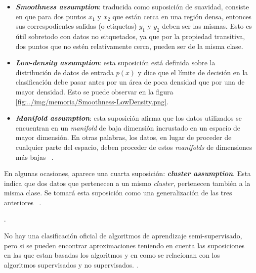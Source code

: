 \begin{itemize}
	\item \textit{\textbf{Smoothness assumption}}: traducida como suposición de suavidad, consiste en que para dos puntos $x_{1}$ y $x_{2}$ que están cerca en una región densa, entonces sus correspodientes salidas (o etiquetas) $y_{1}$ y $y_{2}$ deben ser las mismas. Esto es útil sobretodo con datos no eitquetados, ya que por la propiedad transitiva, dos puntos que no estén relativamente cerca, pueden ser de la misma clase.
	\item \textit{\textbf{Low-density assumption}}: esta suposición está definida sobre la distribución de datos de entrada $p(x)$ y dice que el límite de decisión en la clasificación debe pasar antes por un área de poca densidad que por una de mayor densidad. Esto se puede observar en la figura \ref{fig:../img/memoria/Smoothness-LowDensity.png}.

	
	\item \textit{\textbf{Manifold assumption}}: esta suposición afirma que los datos utilizados se encuentran en un \textit{manifold} de baja dimensión incrustado en un espacio de mayor dimensión. En otras palabras, los datos, en lugar de proceder de cualquier parte del espacio, deben proceder de estos \textit{manifolds} de dimensiones más bajas ~\cite{web:assumptions}.
\end{itemize}

En algunas ocasiones, aparece una cuarta suposición: \textit{\textbf{cluster assumption}}. Esta indica que dos datos que pertenecen a un mismo \textit{cluster}, pertenecen también a la misma clase. Se tomará esta suposición como una generalización de las tres anteriores ~\cite{Engelen:semi-supervised}.

.

No hay una clasificación oficial de algoritmos de aprendizaje semi-supervisado, pero si se pueden encontrar aproximaciones teniendo en cuenta las suposiciones en las que estan basadas los algoritmos y en como se relacionan con los algoritmos supervisados y no supervisados.
.

